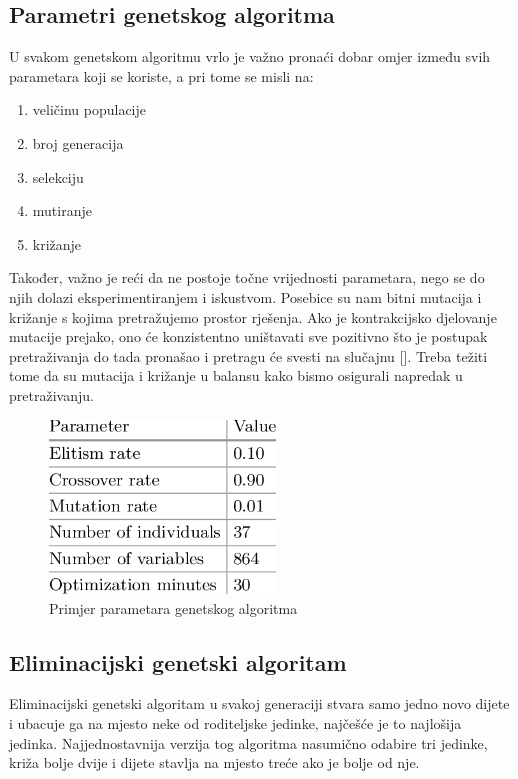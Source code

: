 \documentclass[times, utf8, zavrsni]{fer}
\begin{document}
\subsection{Parametri genetskog algoritma}

U svakom genetskom algoritmu vrlo je važno pronaći dobar omjer između svih parametara koji se koriste, a pri tome se misli na:
\begin{enumerate}
	\item veličinu populacije
	\item broj generacija
	\item selekciju
	\item mutiranje
	\item križanje
\end{enumerate}

Također, važno je reći da ne postoje točne vrijednosti parametara, nego se do njih dolazi eksperimentiranjem i iskustvom. Posebice su nam bitni mutacija i križanje s kojima pretražujemo prostor rješenja. Ako je kontrakcijsko djelovanje mutacije prejako, ono će konzistentno uništavati sve pozitivno što je postupak pretraživanja do tada pronašao i pretragu će svesti na slučajnu [\citep{UI}]. Treba težiti tome da su mutacija i križanje u balansu kako bismo osigurali napredak u pretraživanju. 


\begin{figure}[!htb]
	\centering
	\includegraphics[width=6cm]{slike/genAlgParams.png}
	\caption{Primjer parametara genetskog algoritma}
	\label{fig:gen-params}

\end{figure}


\subsection{Eliminacijski genetski algoritam}

Eliminacijski genetski algoritam u svakoj generaciji stvara samo jedno novo dijete i ubacuje ga na mjesto neke od roditeljske jedinke, najčešće je to najlošija jedinka. Najjednostavnija verzija tog algoritma nasumično odabire tri jedinke, križa bolje dvije i dijete stavlja na mjesto treće ako je bolje od nje.
\end{document}
